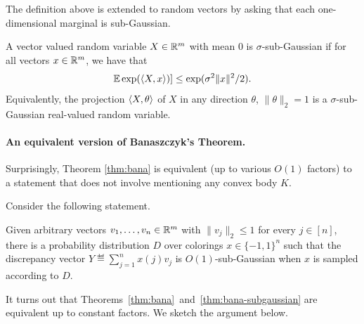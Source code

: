 The definition above is extended to random vectors by asking that each
one-dimensional marginal is sub-Gaussian.

\begin{definition} A vector valued random
  variable $X \in \mathbb{R}^m$ with mean $0$ is $\sigma$-sub-Gaussian if for all vectors $x \in \mathbb{R}^m$, we have that  
\[ \mathbb{E} \exp( \langle X,x\rangle)] \leq \exp(\sigma^2 \|x\|^2/2).\]
Equivalently, the projection $\langle X,\theta\rangle$ of $X$ in any direction
$\theta$, $\|\theta\|_2 = 1$ is a $\sigma$-sub-Gaussian real-valued
random variable.  
\end{definition} 

\paragraph{An equivalent version of Banaszczyk's Theorem.}
Surprisingly,  Theorem \ref{thm:bana} 
is equivalent (up to various $O(1)$ factors) to a statement that does not involve mentioning any convex body $K$.



Consider the following statement.
\begin{theorem}
\label{thm:bana-subgaussian}
    Given arbitrary vectors $v_1,\ldots,v_n \in \mathbb{R}^m$ with $\|v_j\|_2
    \leq 1$ for every $j \in [n]$, there is a probability distribution
    $D$ over colorings $x \in \{-1,1\}^n$ such that the discrepancy
    vector $Y \eqdef \sum_{j=1}^n x(j) v_j$ is $O(1)$-sub-Gaussian
    when $x$ is sampled according to $D$.
\end{theorem}

It turns out that Theorems~\ref{thm:bana}~and~\ref{thm:bana-subgaussian} are equivalent up to constant factors. We sketch the argument below.

